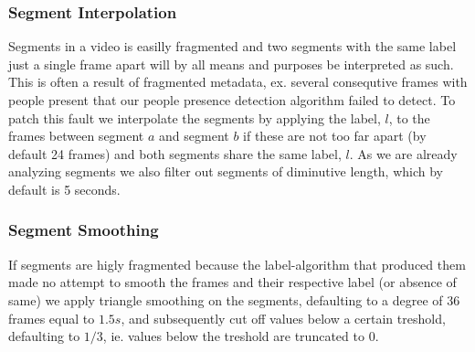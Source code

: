 \subsubsection{Segment Interpolation}\label{sec:labelmerge}
%
%
Segments in a video is easilly fragmented and two segments with the same label just a single frame apart will by all means and purposes be interpreted as such. This is often a result of fragmented metadata, ex. several consequtive frames with people present that our people presence detection algorithm failed to detect. To patch this fault we interpolate the segments by applying the label, $l$, to the frames between segment $a$ and segment $b$ if these are not too far apart (by default 24 frames) and both segments share the same label, $l$. As we are already analyzing segments we also filter out segments of diminutive length, which by default is 5 seconds.
%
\subsubsection{Segment Smoothing}\label{sec:labelsmooth}
%
%
If segments are higly fragmented because the label-algorithm that produced them made no attempt to smooth the frames and their respective label (or absence of same) we apply triangle smoothing on the segments, defaulting to a degree of $36$ frames equal to $1.5s$, and subsequently cut off values below a certain treshold, defaulting to $1/3$, ie. values below the treshold are truncated to $0$.
%
